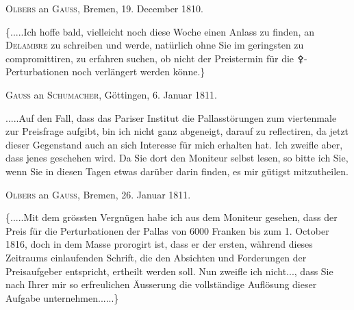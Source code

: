 \par\bigskip
{}
\begin{center}
\textsc{Olbers} an \textsc{Gauss}, Bremen, 19. December 1810.
\end{center}
\noindent\hspace*{\parindent}\{.\quad.\quad.\quad.\quad.\quad Ich hoffe bald, vielleicht noch diese Woche einen Anlass zu finden, an \textsc{Delambre} zu schreiben und werde, natürlich ohne Sie im geringsten zu compromittiren, zu erfahren suchen, ob nicht der Preistermin für die {\AstroSymbols ⚴}-Perturbationen noch verlängert werden könne.\}
\par{}\bigskip
\begin{center}
\textsc{Gauss} an \textsc{Schumacher}, Göttingen, 6. Januar 1811.
\end{center}
\noindent\hspace*{\parindent}.\quad.\quad.\quad.\quad.\quad Auf den Fall, dass das Pariser Institut die Pallasstörungen zum viertenmale zur Preisfrage aufgibt, bin ich nicht ganz abgeneigt, darauf zu reflectiren, da jetzt dieser Gegenstand auch an sich Interesse für mich erhalten hat. Ich zweifle aber, dass jenes geschehen wird. Da Sie dort den Moniteur selbst lesen, so bitte ich Sie, wenn Sie in diesen Tagen etwas darüber darin finden, es mir gütigst mitzutheilen.
\par\bigskip
\begin{center}
\textsc{Olbers} an \textsc{Gauss}, Bremen, 26. Januar 1811.
\end{center}
\noindent\hspace*{\parindent}\{.\quad.\quad.\quad.\quad.\quad Mit dem grössten Vergnügen habe ich aus dem Moniteur gesehen, dass der Preis für die Perturbationen der Pallas von 6000 Franken bis zum 1. October 1816, doch in dem Masse prorogirt ist, dass er der ersten, während dieses Zeitraums einlaufenden Schrift, die den Absichten und Forderungen der Preisaufgeber entspricht, ertheilt werden soll. Nun zweifle ich nicht\quad.\quad.\quad., dass Sie nach Ihrer mir so erfreulichen Äusserung die vollständige Auflösung dieser Aufgabe unternehmen.\quad.\quad.\quad.\quad.\quad.\}
\par
